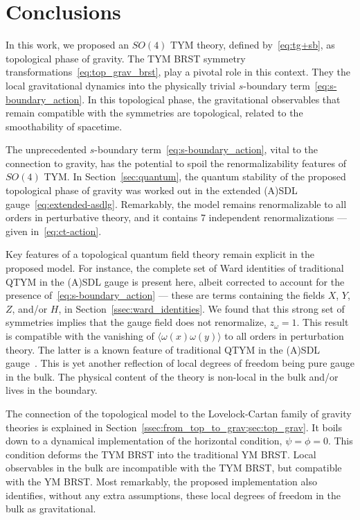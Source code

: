 \documentclass[../main.tex]{subfiles}
\begin{document}
\section{Conclusions}%
\label{sec:conclusions}

In this work, we proposed an $ SO \left( 4 \right) $ TYM theory, defined by~\eqref{eq:tg+sb}, as topological phase of gravity. The TYM BRST symmetry transformations~\eqref{eq:top_grav_brst}, play a pivotal role in this context. They  the local gravitational dynamics into the physically trivial $s$-boundary term~\eqref{eq:s-boundary_action}. In this topological phase, the gravitational observables that remain compatible with the symmetries are topological, related to the smoothability of spacetime.

The unprecedented $ s $-boundary term~\eqref{eq:s-boundary_action}, vital to the connection to gravity, has the potential to spoil the renormalizability features of $ SO(4) $ TYM\@. In Section~\ref{sec:quantum}, the quantum stability of the proposed topological phase of gravity was worked out in the extended (A)SDL gauge~\eqref{eq:extended-asdlg}. Remarkably, the model remains renormalizable to all orders in perturbative theory, and it contains 7 independent renormalizations --- given in~\eqref{eq:ct-action}.

Key features of a topological quantum field theory remain explicit in the proposed model. For instance, the complete set of Ward identities of traditional QTYM in the (A)SDL gauge is present here, albeit corrected to account for the presence of~\eqref{eq:s-boundary_action} --- these are terms containing the fields $ X $, $ Y $, $ Z $, and/or $ H $, in Section~\ref{ssec:ward_identities}. We found that this strong set of symmetries implies that the gauge field does not renormalize, $ z_{ \omega } = 1 $. This result is compatible with the vanishing of $ \langle \omega(x) \omega(y) \rangle $ to all orders in perturbation theory. The latter is a known feature of traditional QTYM in the (A)SDL gauge~\cite{sadovski2017c,sadovski2018a}. This is yet another reflection of local degrees of freedom being pure gauge in the bulk. The physical content of the theory is non-local in the bulk and/or lives in the boundary.

The connection of the topological model to the Lovelock-Cartan family of gravity theories is explained in Section~\ref{ssec:from_top_to_grav;sec:top_grav}. It boils down to a dynamical implementation of the horizontal condition, $ \psi = \phi = 0 $. This condition deforms the TYM BRST into the traditional YM BRST\@. Local observables in the bulk are incompatible with the TYM BRST, but compatible with the YM BRST\@. Most remarkably, the proposed implementation also identifies, without any extra assumptions, these local degrees of freedom in the bulk as gravitational.
\end{document}
